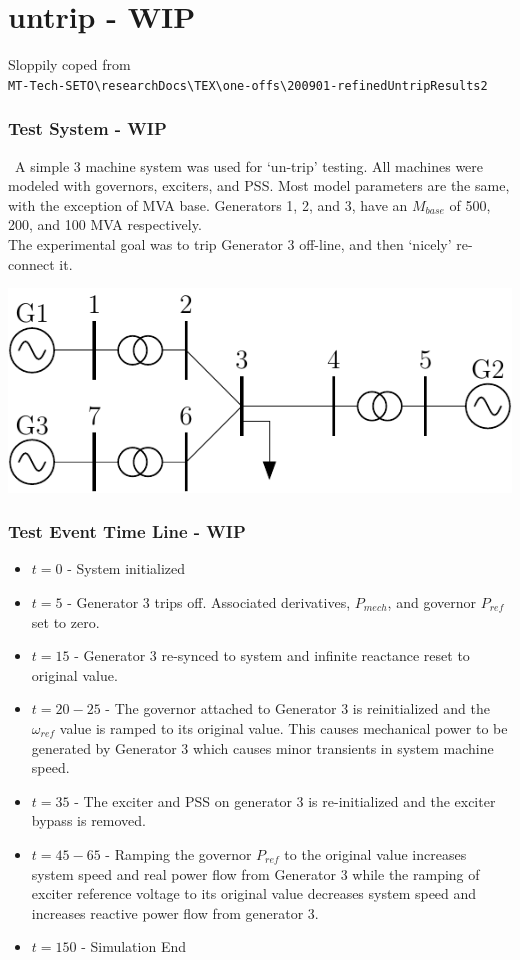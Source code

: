 \section{untrip - WIP}
\noindent Sloppily coped from\\ \verb|MT-Tech-SETO\researchDocs\TEX\one-offs\200901-refinedUntripResults2|
\subsubsection{Test System - WIP}\ A simple 3 machine system was used for `un-trip' testing.
All machines were modeled with governors, exciters, and PSS.
Most model parameters are the same, with the exception of MVA base.
Generators 1, 2, and 3, have an $M_{base}$ of 500, 200, and 100 MVA respectively. \\
The experimental goal was to trip Generator 3 off-line, and then `nicely' re-connect it.\\


\begin{center}
\includegraphics[width=.6\linewidth]{examples/untrip/200831-3mach7bus}
\end{center}

\subsubsection{Test Event Time Line - WIP}
\begin{itemize}
 em
\singlespacing
\item $t=0$ - System initialized
\item $t=5$ - Generator 3 trips off.
Associated derivatives, $P_{mech}$, and governor $P_{ref}$ set to zero.
\item $t=15$ - Generator 3 re-synced to system and infinite reactance reset to original value. 

\item $t=20-25$ - The governor attached to Generator 3 is reinitialized and the $\omega_{ref}$ value is ramped to its original value. 
This causes mechanical power to be generated by Generator 3 which causes minor transients in system machine speed.
\item $t=35$ - The exciter and PSS on generator 3 is re-initialized and the exciter bypass is removed.
\item $t=45-65$ - Ramping the governor $P_{ref}$ to the original value increases system speed  and real power flow from Generator 3 while the ramping of exciter reference voltage to its original value decreases system speed and increases reactive power flow from generator 3.
\item $t=150$ - Simulation End
\end{itemize}

